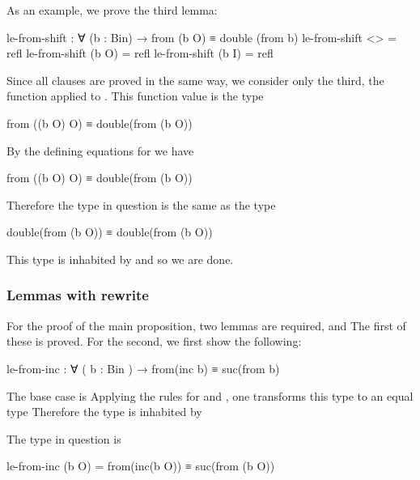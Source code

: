 As an example, we prove the third lemma:

\begin{colored}[elm]
le-from-shift : ∀ (b : Bin) → from (b O) ≡ double (from b)
le-from-shift <> = refl
le-from-shift (b O) = refl
le-from-shift (b I) = refl
\end{colored}

Since all clauses are proved in the same way, we consider only the third, the function  applied  to . This function value is the type

\begin{colored}[elm]
from ((b O) O) ≡ double(from (b O))
\end{colored}

By the defining equations for  we have

\begin{colored}[elm]
from ((b O) O) ≡ double(from (b O))
\end{colored}

Therefore the type in question is the same as the type

\begin{colored}[elm]
double(from (b O)) ≡ double(from (b O))
\end{colored}

This type is inhabited by   and so we are done.

\subsubsection{Lemmas with rewrite}

For the proof of the main proposition, two lemmas are required,  and  The first of these is proved. For the second, we first show the following:

\begin{colored}[elm]
le-from-inc : ∀ ( b : Bin ) → from(inc b) ≡ suc(from b)
\end{colored}


The base case is  Applying the rules for  and , one transforms this type to an equal type  Therefore the type  is inhabited by 


The type in question is

\begin{colored}[elm]
le-from-inc (b O) = from(inc(b O))  ≡ suc(from (b O))
\end{colored}

